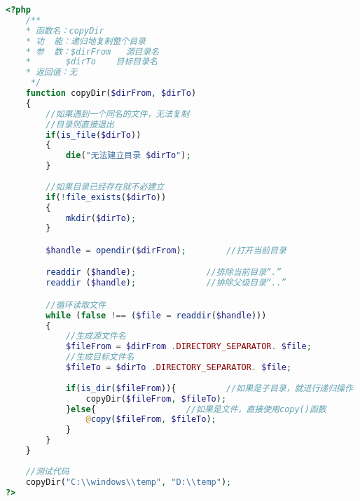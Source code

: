 \begin{lstlisting}[language=PHP]
<?php
	/**
	* 函数名：copyDir
	* 功  能：递归地复制整个目录
	* 参  数：$dirFrom   源目录名
	*		$dirTo	  目标目录名
	* 返回值：无
     */
	function copyDir($dirFrom, $dirTo)
	{
		//如果遇到一个同名的文件，无法复制
		//目录则直接退出
		if(is_file($dirTo))
		{
			die("无法建立目录 $dirTo");
		}
		
		//如果目录已经存在就不必建立
		if(!file_exists($dirTo))
		{
			mkdir($dirTo);
		}

		$handle = opendir($dirFrom);		//打开当前目录

		readdir ($handle);				//排除当前目录“.”
		readdir ($handle);				//排除父级目录“..”

		//循环读取文件
		while (false !== ($file = readdir($handle))) 
		{
			//生成源文件名
			$fileFrom = $dirFrom .DIRECTORY_SEPARATOR. $file;
			//生成目标文件名
			$fileTo = $dirTo .DIRECTORY_SEPARATOR. $file;
			
			if(is_dir($fileFrom)){			//如果是子目录，就进行递归操作
				copyDir($fileFrom, $fileTo);
			}else{					//如果是文件，直接使用copy()函数
				@copy($fileFrom, $fileTo);
			}
		}
	}
	
	//测试代码
	copyDir("C:\\windows\\temp", "D:\\temp");
?>
\end{lstlisting}



\begin{lstlisting}[language=PHP]

\end{lstlisting}



\begin{lstlisting}[language=PHP]

\end{lstlisting}




\begin{lstlisting}[language=PHP]

\end{lstlisting}




\begin{lstlisting}[language=PHP]

\end{lstlisting}





